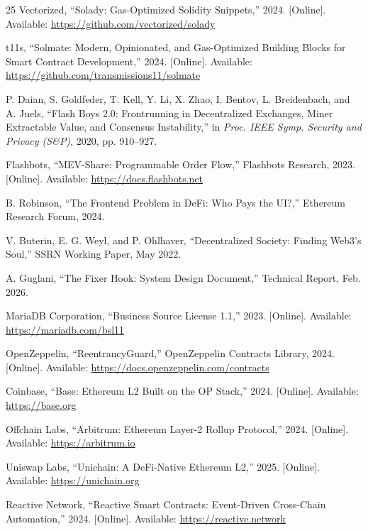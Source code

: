 \documentclass[conference]{IEEEtran}
\begin{document}
\begin{thebibliography}{25}
Vectorized, ``Solady: Gas-Optimized Solidity Snippets,'' 2024. [Online]. Available: \url{https://github.com/vectorized/solady}

t11s, ``Solmate: Modern, Opinionated, and Gas-Optimized Building Blocks for Smart Contract Development,'' 2024. [Online]. Available: \url{https://github.com/transmissions11/solmate}

P. Daian, S. Goldfeder, T. Kell, Y. Li, X. Zhao, I. Bentov, L. Breidenbach, and A. Juels, ``Flash Boys 2.0: Frontrunning in Decentralized Exchanges, Miner Extractable Value, and Consensus Instability,'' in \textit{Proc. IEEE Symp. Security and Privacy (S\&P)}, 2020, pp. 910--927.

Flashbots, ``MEV-Share: Programmable Order Flow,'' Flashbots Research, 2023. [Online]. Available: \url{https://docs.flashbots.net}

B. Robinson, ``The Frontend Problem in DeFi: Who Pays the UI?,'' Ethereum Research Forum, 2024.

V. Buterin, E. G. Weyl, and P. Ohlhaver, ``Decentralized Society: Finding Web3's Soul,'' SSRN Working Paper, May 2022.

A. Guglani, ``The Fixer Hook: System Design Document,'' Technical Report, Feb. 2026.

MariaDB Corporation, ``Business Source License 1.1,'' 2023. [Online]. Available: \url{https://mariadb.com/bsl11}

OpenZeppelin, ``ReentrancyGuard,'' OpenZeppelin Contracts Library, 2024. [Online]. Available: \url{https://docs.openzeppelin.com/contracts}

Coinbase, ``Base: Ethereum L2 Built on the OP Stack,'' 2024. [Online]. Available: \url{https://base.org}

Offchain Labs, ``Arbitrum: Ethereum Layer-2 Rollup Protocol,'' 2024. [Online]. Available: \url{https://arbitrum.io}

Uniswap Labs, ``Unichain: A DeFi-Native Ethereum L2,'' 2025. [Online]. Available: \url{https://unichain.org}

Reactive Network, ``Reactive Smart Contracts: Event-Driven Cross-Chain Automation,'' 2024. [Online]. Available: \url{https://reactive.network}

\end{thebibliography}
\end{document}
